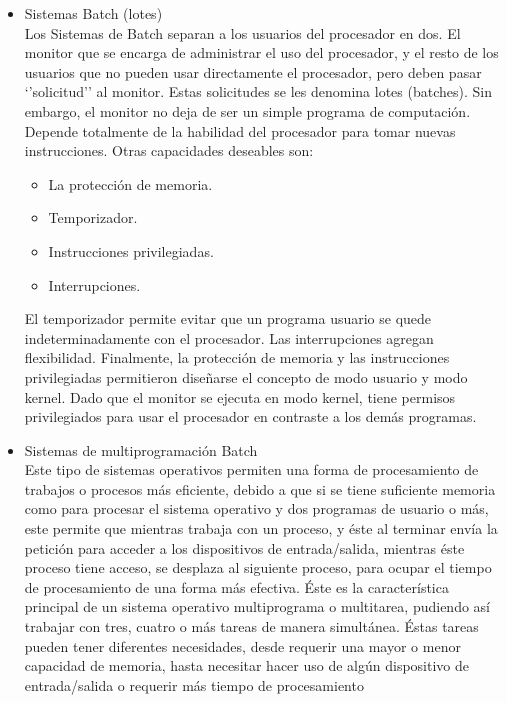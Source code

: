 \begin{itemize}
		
		\item Sistemas Batch (lotes)\\
		Los Sistemas de Batch separan a los usuarios del procesador en dos. El monitor que se encarga de administrar el uso del procesador, y el resto de los usuarios que no pueden usar directamente el procesador, pero deben pasar ‘’solicitud’’ al monitor. Estas solicitudes se les denomina lotes (batches).
		Sin embargo, el monitor no deja de ser un simple programa de computación. Depende totalmente de la habilidad del procesador para tomar nuevas instrucciones. Otras capacidades deseables son:
		\begin{itemize}
		\item	La protección de memoria.
		\item	Temporizador.
		\item	Instrucciones privilegiadas.
		\item	Interrupciones.
		\end{itemize}
		
		El temporizador permite evitar que un programa usuario se quede indeterminadamente con el procesador. Las interrupciones agregan flexibilidad.
		Finalmente, la protección de memoria y las instrucciones privilegiadas permitieron diseñarse el concepto de modo usuario y modo kernel. Dado que el monitor se ejecuta en modo kernel, tiene permisos privilegiados para usar el procesador en contraste a los demás programas.	
		
		\item Sistemas de multiprogramación Batch\\
Este tipo de sistemas operativos permiten una forma de procesamiento de trabajos o procesos más eficiente, debido a que si se tiene suficiente memoria como para procesar el sistema operativo y dos programas de usuario o más, este permite que mientras trabaja con un proceso, y éste al terminar envía la petición para acceder a los dispositivos de entrada/salida, mientras éste proceso tiene acceso, se desplaza al siguiente proceso, para ocupar el tiempo de procesamiento de una forma más efectiva.
Éste es la característica principal de un sistema operativo multiprograma o multitarea, pudiendo así trabajar con tres, cuatro o más tareas de manera simultánea. Éstas tareas pueden tener diferentes necesidades, desde requerir una mayor o menor capacidad de memoria, hasta necesitar hacer uso de algún dispositivo de entrada/salida o requerir más tiempo de procesamiento


\end{itemize}
